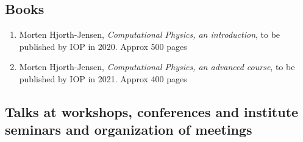 \documentclass[prc,amsart,english,superscriptaddress,showpacs,floatfix]{revtex4}
\begin{document}
\subsection*{Books}
\begin{enumerate}
\item Morten Hjorth-Jensen, \emph{Computational Physics, an introduction}, to be published by IOP in 2020. Approx 500 pages

\item Morten Hjorth-Jensen, \emph{Computational Physics, an advanced course}, to be published by IOP in 2021. Approx 400 pages

\end{enumerate}



 \subsection*{Talks at workshops, conferences and institute seminars and organization of meetings}
\end{document}
